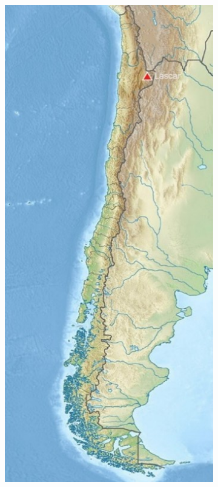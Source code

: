 \documentclass[journal]{IEEEtran}
\begin{document}
\begin{figure}
\begin{subfigure}{0.27\textwidth}
  \footnotesize
    \includegraphics[width=\linewidth]{img/lascar_ubicacion.jpg}

\end{subfigure}
\end{figure}
\end{document}
